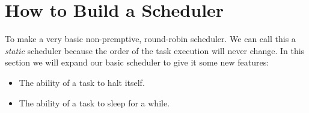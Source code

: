 %
%
%
%
%
%
% 
%
%
%
%
%
%
%
\section{How to Build a Scheduler}	%
%
To make a very basic non-premptive, round-robin scheduler.   We can call this a {\it static} scheduler because the order of the task execution will never change. 
In this section we will expand our basic scheduler to give it some new features: 

\begin{itemize}
  \item The ability of a task to halt itself.
  \item The ability of a task to sleep for a while.
\end{itemize}

